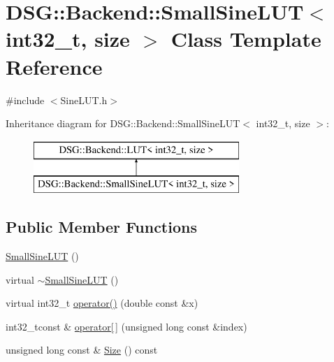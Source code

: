 \hypertarget{classDSG_1_1Backend_1_1SmallSineLUT_3_01int32__t_00_01size_01_4}{\section{D\+S\+G\+:\+:Backend\+:\+:Small\+Sine\+L\+U\+T$<$ int32\+\_\+t, size $>$ Class Template Reference}
\label{classDSG_1_1Backend_1_1SmallSineLUT_3_01int32__t_00_01size_01_4}
}


{\ttfamily \#include $<$Sine\+L\+U\+T.\+h$>$}

Inheritance diagram for D\+S\+G\+:\+:Backend\+:\+:Small\+Sine\+L\+U\+T$<$ int32\+\_\+t, size $>$\+:\begin{figure}[H]
\begin{center}
\leavevmode
\includegraphics[height=2.000000cm]{classDSG_1_1Backend_1_1SmallSineLUT_3_01int32__t_00_01size_01_4}
\end{center}
\end{figure}
\subsection*{Public Member Functions}
\begin{DoxyCompactItemize}
\item 
\hyperlink{classDSG_1_1Backend_1_1SmallSineLUT_3_01int32__t_00_01size_01_4_ad6c60ff274c31fa8aac6353b9089a8e8}{Small\+Sine\+L\+U\+T} ()
\item 
virtual \hyperlink{classDSG_1_1Backend_1_1SmallSineLUT_3_01int32__t_00_01size_01_4_a1c8fd85f2ce8d0283997096159442678}{$\sim$\+Small\+Sine\+L\+U\+T} ()
\item 
virtual int32\+\_\+t \hyperlink{classDSG_1_1Backend_1_1SmallSineLUT_3_01int32__t_00_01size_01_4_af8b347ef429ec5b6edbe7b752a003d2e}{operator()} (double const \&x)
\item 
int32\+\_\+tconst \& \hyperlink{classDSG_1_1Backend_1_1LUT_a50d8304c33760ed566039ebf5657807c}{operator\mbox{[}$\,$\mbox{]}} (unsigned long const \&index)
\item 
unsigned long const \& \hyperlink{classDSG_1_1Backend_1_1LUT_a988c07b5002e0aee6e490244b80c8830}{Size} () const
\end{DoxyCompactItemize}
